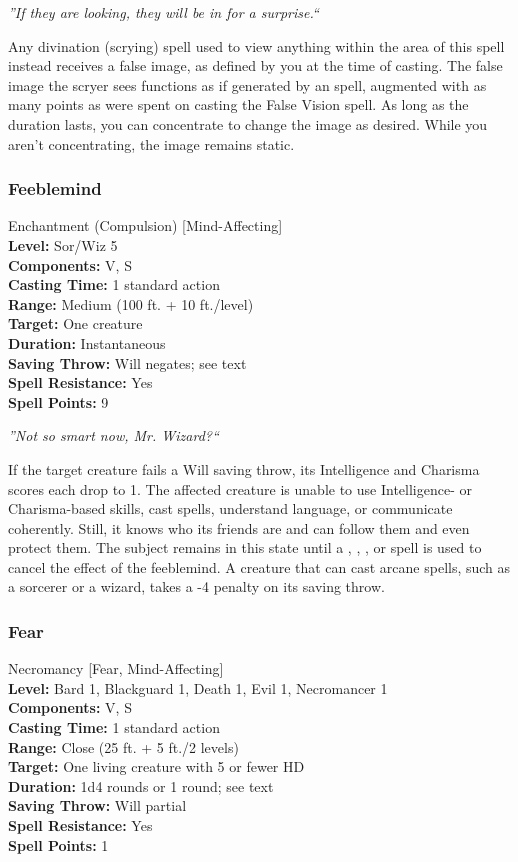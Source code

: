 \emph{''If they are looking, they will be in for a surprise.``}

Any divination (scrying) spell used to view anything within the area of this spell instead receives a false image, as defined by you at the time of casting. 
The false image the scryer sees functions as if generated by an  spell, augmented with as many points as were spent on casting the
False Vision spell.
As long as the duration lasts, you can concentrate to change the image as desired. 
While you aren't concentrating, the image remains static.
\subsubsection{Feeblemind}
\label{Spell:Feeblemind}
Enchantment (Compulsion) [Mind-Affecting]
\\ \textbf{Level:} Sor/Wiz 5
\\ \textbf{Components:} V, S
\\ \textbf{Casting Time:} 1 standard action
\\ \textbf{Range:} Medium (100 ft. + 10 ft./level)
\\ \textbf{Target:} One creature
\\ \textbf{Duration:} Instantaneous
\\ \textbf{Saving Throw:} Will negates; see text
\\ \textbf{Spell Resistance:} Yes
\\ \textbf{Spell Points:} 9

\emph{''Not so smart now, Mr. Wizard?``}

If the target creature fails a Will saving throw, its Intelligence and Charisma scores each drop to 1. 
The affected creature is unable to use Intelligence- or Charisma-based skills, cast spells, understand language, or communicate coherently. 
Still, it knows who its friends are and can follow them and even protect them. 
The subject remains in this state until a ,  , 
, or  spell is used to cancel the effect of the feeblemind. 
A creature that can cast arcane spells, such as a sorcerer or a wizard, takes a -4 penalty on its saving throw.

\subsubsection{Fear}
\label{Spell:Fear}
Necromancy [Fear, Mind-Affecting]
\\ \textbf{Level:} Bard 1, Blackguard 1, Death 1, Evil 1, Necromancer 1
\\ \textbf{Components:} V, S
\\ \textbf{Casting Time:} 1 standard action
\\ \textbf{Range:} Close (25 ft. + 5 ft./2 levels)
\\ \textbf{Target:} One living creature with 5 or fewer HD
\\ \textbf{Duration:} 1d4 rounds or 1 round; see text
\\ \textbf{Saving Throw:} Will partial
\\ \textbf{Spell Resistance:} Yes
\\ \textbf{Spell Points:} 1

